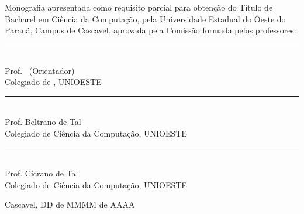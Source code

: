 

\begin{center}
\fontsize{12}{12}
\textbf{\MakeUppercase{\imprimirautor}} \\

\vspace{3cm}
\fontsize{14}{14}
\textbf{\MakeUppercase{\imprimirtitulo}}\\
\vspace{3cm}
\fontsize{10}{10}
Monografia apresentada como requisito parcial para obtenção do Título de Bacharel em Ciência da Computação, pela Universidade Estadual do Oeste do Paraná, Campus de Cascavel, aprovada pela Comissão formada pelos professores:\\
\vspace{2cm}
\begin{flushright}
\begin{minipage}[10cm] {8.5cm}
\begin{center}
\rule{6cm}{0.01mm}\\
Prof. \imprimirorientador\ (Orientador)\\
Colegiado de \imprimircurso, UNIOESTE\\
\vspace{1cm}
\rule{6cm}{0.01mm}\\
Prof. Beltrano de Tal\\
Colegiado de Ciência da Computação, UNIOESTE\\
\vspace{1cm}
\rule{6cm}{0.01mm}\\
Prof. Cicrano de Tal\\
Colegiado de Ciência da Computação, UNIOESTE\\
\end{center}
\end{minipage}
\end{flushright}
\vspace{4.3cm}
Cascavel, DD de MMMM de AAAA %
\end{center} 